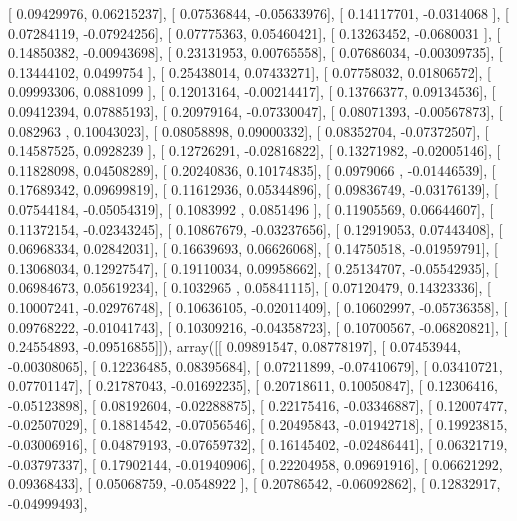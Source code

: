 \documentclass{article}
\begin{document}
       [ 0.09429976,  0.06215237],
       [ 0.07536844, -0.05633976],
       [ 0.14117701, -0.0314068 ],
       [ 0.07284119, -0.07924256],
       [ 0.07775363,  0.05460421],
       [ 0.13263452, -0.0680031 ],
       [ 0.14850382, -0.00943698],
       [ 0.23131953,  0.00765558],
       [ 0.07686034, -0.00309735],
       [ 0.13444102,  0.0499754 ],
       [ 0.25438014,  0.07433271],
       [ 0.07758032,  0.01806572],
       [ 0.09993306,  0.0881099 ],
       [ 0.12013164, -0.00214417],
       [ 0.13766377,  0.09134536],
       [ 0.09412394,  0.07885193],
       [ 0.20979164, -0.07330047],
       [ 0.08071393, -0.00567873],
       [ 0.082963  ,  0.10043023],
       [ 0.08058898,  0.09000332],
       [ 0.08352704, -0.07372507],
       [ 0.14587525,  0.0928239 ],
       [ 0.12726291, -0.02816822],
       [ 0.13271982, -0.02005146],
       [ 0.11828098,  0.04508289],
       [ 0.20240836,  0.10174835],
       [ 0.0979066 , -0.01446539],
       [ 0.17689342,  0.09699819],
       [ 0.11612936,  0.05344896],
       [ 0.09836749, -0.03176139],
       [ 0.07544184, -0.05054319],
       [ 0.1083992 ,  0.0851496 ],
       [ 0.11905569,  0.06644607],
       [ 0.11372154, -0.02343245],
       [ 0.10867679, -0.03237656],
       [ 0.12919053,  0.07443408],
       [ 0.06968334,  0.02842031],
       [ 0.16639693,  0.06626068],
       [ 0.14750518, -0.01959791],
       [ 0.13068034,  0.12927547],
       [ 0.19110034,  0.09958662],
       [ 0.25134707, -0.05542935],
       [ 0.06984673,  0.05619234],
       [ 0.1032965 ,  0.05841115],
       [ 0.07120479,  0.14323336],
       [ 0.10007241, -0.02976748],
       [ 0.10636105, -0.02011409],
       [ 0.10602997, -0.05736358],
       [ 0.09768222, -0.01041743],
       [ 0.10309216, -0.04358723],
       [ 0.10700567, -0.06820821],
       [ 0.24554893, -0.09516855]]), array([[ 0.09891547,  0.08778197],
       [ 0.07453944, -0.00308065],
       [ 0.12236485,  0.08395684],
       [ 0.07211899, -0.07410679],
       [ 0.03410721,  0.07701147],
       [ 0.21787043, -0.01692235],
       [ 0.20718611,  0.10050847],
       [ 0.12306416, -0.05123898],
       [ 0.08192604, -0.02288875],
       [ 0.22175416, -0.03346887],
       [ 0.12007477, -0.02507029],
       [ 0.18814542, -0.07056546],
       [ 0.20495843, -0.01942718],
       [ 0.19923815, -0.03006916],
       [ 0.04879193, -0.07659732],
       [ 0.16145402, -0.02486441],
       [ 0.06321719, -0.03797337],
       [ 0.17902144, -0.01940906],
       [ 0.22204958,  0.09691916],
       [ 0.06621292,  0.09368433],
       [ 0.05068759, -0.0548922 ],
       [ 0.20786542, -0.06092862],
       [ 0.12832917, -0.04999493],
\end{document}
